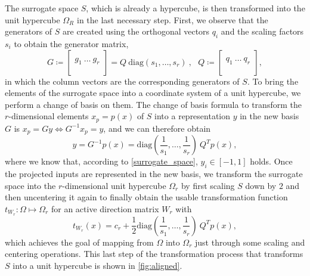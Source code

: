 \documentclass[
  a4paper,  %
  twoside,  %
  bibliography=totoc,
  headsepline,
  cleardoublepage=empty,
  parskip=half,
  draft=false
]{scrbook}
\begin{document}
The surrogate space $S$, which is already a hypercube, is then transformed into the unit hypercube $\Omega_R$ in the last necessary step.
First, we observe that the generators of $S$ are created using the orthogonal vectors $q_i$ and the scaling factors $s_i$ to obtain the generator matrix,
\begin{equation}
G \coloneqq \begin{bmatrix}
  \\
    g_1 ~ \dots  ~ g_r\\
    \\
  \end{bmatrix}=Q ~ \text{diag}(s_1, \dots, s_r) ~, ~~~
Q \coloneqq \begin{bmatrix}
  \\
    q_1 ~ \dots  ~ q_r\\
    \\
  \end{bmatrix},
\end{equation}
in which the column vectors are the corresponding generators of $S$.
To bring the elements of the surrogate space into a coordinate system of a unit hypercube, we perform a change of basis on them.
The change of basis formula to transform the $r$-dimensional elements $x_p=p(x)$ of $S$ into a representation $y$ in the new basis $G$ is $x_p=Gy \Leftrightarrow G^{-1} x_p=y$, and we can therefore obtain
\begin{equation}
y=G^{-1} p(x)=\text{diag}\left(\frac{1}{s_1}, \dots, \frac{1}{s_r}\right) ~Q^T p(x),
\label{alignment}
\end{equation}
where we know that, according to \cref{surrogate_space}, $y_i \in [-1,1]$ holds.
Once the projected inputs are represented in the new basis, we transform the surrogate space into the $r$-dimensional unit hypercube $\Omega_r$ by first scaling $S$ down by $2$ and then uncentering it again to finally obtain the usable transformation function $t_{W_r} \colon \Omega \mapsto \Omega_r$ for an active direction matrix $W_r$ with
\begin{equation}
t_{W_r}(x) = c_r + \frac{1}{2} \text{diag}\left(\frac{1}{s_1}, \dots, \frac{1}{s_r}\right) ~Q^T p(x),
\label{linear_trans}
\end{equation}
which achieves the goal of mapping from $\Omega$ into $\Omega_r$ just through some scaling and centering operations.
This last step of the transformation process that transforms $S$ into a unit hypercube is shown in \cref{fig:aligned}.
\end{document}
